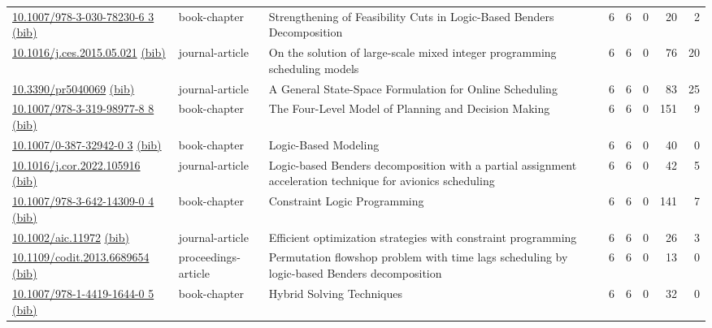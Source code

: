 {\begin{longtable}{p{5cm}lp{11cm}rrrrr}
\href{http://dx.doi.org/10.1007/978-3-030-78230-6_3}{10.1007/978-3-030-78230-6 3} \href{https://www.doi2bib.org/bib/10.1007/978-3-030-78230-6_3}{(bib)} & book-chapter & Strengthening of Feasibility Cuts in Logic-Based Benders Decomposition & 6 & 6 & 0 & 20 & 2 \\
\href{http://dx.doi.org/10.1016/j.ces.2015.05.021}{10.1016/j.ces.2015.05.021} \href{https://www.doi2bib.org/bib/10.1016/j.ces.2015.05.021}{(bib)} & journal-article & On the solution of large-scale mixed integer programming scheduling models & 6 & 6 & 0 & 76 & 20 \\
\href{http://dx.doi.org/10.3390/pr5040069}{10.3390/pr5040069} \href{https://www.doi2bib.org/bib/10.3390/pr5040069}{(bib)} & journal-article & A General State-Space Formulation for Online Scheduling & 6 & 6 & 0 & 83 & 25 \\
\href{http://dx.doi.org/10.1007/978-3-319-98977-8_8}{10.1007/978-3-319-98977-8 8} \href{https://www.doi2bib.org/bib/10.1007/978-3-319-98977-8_8}{(bib)} & book-chapter & The Four-Level Model of Planning and Decision Making & 6 & 6 & 0 & 151 & 9 \\
\href{http://dx.doi.org/10.1007/0-387-32942-0_3}{10.1007/0-387-32942-0 3} \href{https://www.doi2bib.org/bib/10.1007/0-387-32942-0_3}{(bib)} & book-chapter & Logic-Based Modeling & 6 & 6 & 0 & 40 & 0 \\
\href{http://dx.doi.org/10.1016/j.cor.2022.105916}{10.1016/j.cor.2022.105916} \href{https://www.doi2bib.org/bib/10.1016/j.cor.2022.105916}{(bib)} & journal-article & Logic-based Benders decomposition with a partial assignment acceleration technique for avionics scheduling & 6 & 6 & 0 & 42 & 5 \\
\href{http://dx.doi.org/10.1007/978-3-642-14309-0_4}{10.1007/978-3-642-14309-0 4} \href{https://www.doi2bib.org/bib/10.1007/978-3-642-14309-0_4}{(bib)} & book-chapter & Constraint Logic Programming & 6 & 6 & 0 & 141 & 7 \\
\href{http://dx.doi.org/10.1002/aic.11972}{10.1002/aic.11972} \href{https://www.doi2bib.org/bib/10.1002/aic.11972}{(bib)} & journal-article & Efficient optimization strategies with constraint programming & 6 & 6 & 0 & 26 & 3 \\
\href{http://dx.doi.org/10.1109/codit.2013.6689654}{10.1109/codit.2013.6689654} \href{https://www.doi2bib.org/bib/10.1109/codit.2013.6689654}{(bib)} & proceedings-article & Permutation flowshop problem with time lags scheduling by logic-based Benders decomposition & 6 & 6 & 0 & 13 & 0 \\
\href{http://dx.doi.org/10.1007/978-1-4419-1644-0_5}{10.1007/978-1-4419-1644-0 5} \href{https://www.doi2bib.org/bib/10.1007/978-1-4419-1644-0_5}{(bib)} & book-chapter & Hybrid Solving Techniques & 6 & 6 & 0 & 32 & 0 \\

\end{longtable}}
